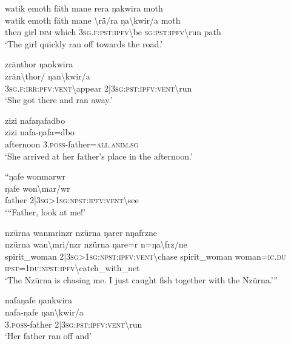\ea\label{ex:6:a1241}
watik emoth fäth mane rera ŋakwira moth\\
\gll watik	emoth	fäth	mane	{\textbackslash}rä/ra	ŋa{\textbackslash}kwir/a	moth\\
     then	girl	\textsc{dim}	which	3\textsc{sg}.\textsc{f}:\textsc{pst}:\textsc{ipfv}{\textbackslash}be	\textsc{sg}:\textsc{pst}:\textsc{ipfv}{\textbackslash}run	path\\
\glt `The girl quickly ran off towards the road.'
\z

\ea\label{ex:6:a1242}
zränthor ŋankwira\\
\gll zrän{\textbackslash}thor/	ŋan{\textbackslash}kwir/a\\
     3\textsc{sg}.\textsc{f}:\textsc{irr}:\textsc{pfv}:\textsc{vent}{\textbackslash}appear	2|3\textsc{sg}:\textsc{pst}:\textsc{ipfv}:\textsc{vent}{\textbackslash}run\\
\glt `She got there and ran away.'
\z

\ea\label{ex:6:a1243}
zizi nafaŋafadbo\\
\gll zizi	nafa-ŋafa=dbo\\
     afternoon	3.\textsc{poss}-father=\textsc{all}.\textsc{anim}.\textsc{sg}\\
\glt `She arrived at her father's place in the afternoon.'
\z

\ea\label{ex:6:a1244}
``ŋafe wonmarwr\\
\gll ŋafe	won{\textbackslash}mar/wr\\
     father	2|3\textsc{sg}>1\textsc{sg}:\textsc{npst}:\textsc{ipfv}:\textsc{vent}{\textbackslash}see\\
\glt `{``}Father, look at me!'
\z

\ea\label{ex:6:a1245}
nzürna wanmrinzr nzürna ŋarer nŋafrzne\\
\gll nzürna	wan{\textbackslash}mri/nzr	nzürna	ŋare=r	n=ŋa{\textbackslash}frz/ne\\
     spirit\_woman	2|3\textsc{sg}>1\textsc{sg}:\textsc{npst}:\textsc{ipfv}:\textsc{vent}{\textbackslash}chase	spirit\_woman	woman=\textsc{ic}.\textsc{du}	\textsc{ipst}=1\textsc{du}:\textsc{npst}:\textsc{ipfv}{\textbackslash}catch\_with\_net\\
\glt `The Nzürna is chasing me. I just caught fish together with the Nzürna.'''
\z

\ea\label{ex:6:a1246}
nafaŋafe ŋankwira\\
\gll nafa-ŋafe	ŋan{\textbackslash}kwir/a\\
     3.\textsc{poss}-father	2|3\textsc{sg}:\textsc{pst}:\textsc{ipfv}:\textsc{vent}{\textbackslash}run\\
\glt `Her father ran off and'
\z

